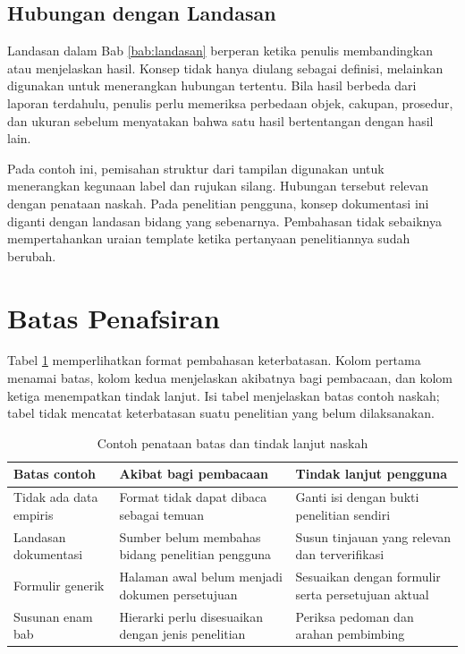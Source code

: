 \subsection{Hubungan dengan Landasan}

Landasan dalam Bab \ref{bab:landasan} berperan ketika penulis membandingkan atau menjelaskan hasil. Konsep tidak hanya diulang sebagai definisi, melainkan digunakan untuk menerangkan hubungan tertentu. Bila hasil berbeda dari laporan terdahulu, penulis perlu memeriksa perbedaan objek, cakupan, prosedur, dan ukuran sebelum menyatakan bahwa satu hasil bertentangan dengan hasil lain.

Pada contoh ini, pemisahan struktur dari tampilan digunakan untuk menerangkan kegunaan label dan rujukan silang. Hubungan tersebut relevan dengan penataan naskah. Pada penelitian pengguna, konsep dokumentasi ini diganti dengan landasan bidang yang sebenarnya. Pembahasan tidak sebaiknya mempertahankan uraian template ketika pertanyaan penelitiannya sudah berubah.

\section{Batas Penafsiran}

Tabel \ref{tab:contoh-keterbatasan} memperlihatkan format pembahasan keterbatasan. Kolom pertama menamai batas, kolom kedua menjelaskan akibatnya bagi pembacaan, dan kolom ketiga menempatkan tindak lanjut. Isi tabel menjelaskan batas contoh naskah; tabel tidak mencatat keterbatasan suatu penelitian yang belum dilaksanakan.

\begin{table}[htbp]
  \centering
  \caption{Contoh penataan batas dan tindak lanjut naskah}
  \label{tab:contoh-keterbatasan}
  \begin{tabular}{p{3.0cm}p{4.4cm}p{4.8cm}}
    \toprule
    Batas contoh & Akibat bagi pembacaan & Tindak lanjut pengguna \\
    \midrule
    Tidak ada data empiris & Format tidak dapat dibaca sebagai temuan & Ganti isi dengan bukti penelitian sendiri \\
    Landasan dokumentasi & Sumber belum membahas bidang penelitian pengguna & Susun tinjauan yang relevan dan terverifikasi \\
    Formulir generik & Halaman awal belum menjadi dokumen persetujuan & Sesuaikan dengan formulir serta persetujuan aktual \\
    Susunan enam bab & Hierarki perlu disesuaikan dengan jenis penelitian & Periksa pedoman dan arahan pembimbing \\
    \bottomrule
  \end{tabular}
\end{table}

